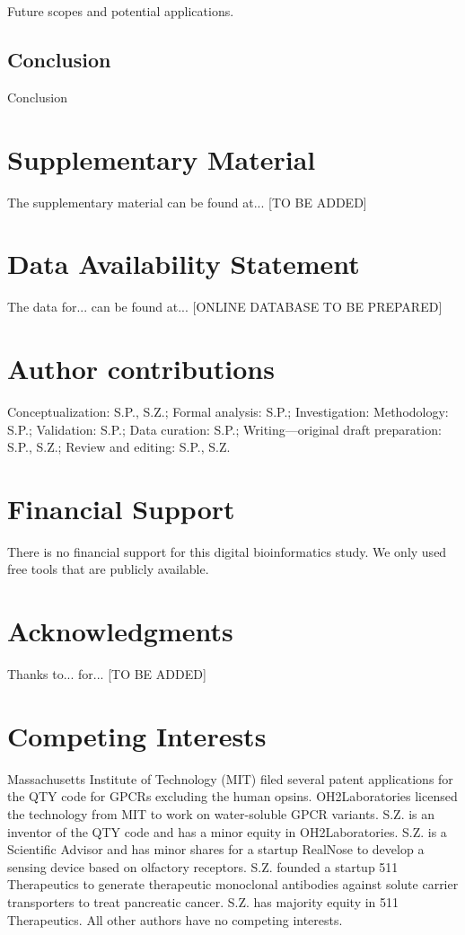 \documentclass[fleqn, 10pt, lineno]{manuscript}
\begin{document}
Future scopes and potential applications. 

\subsection*{Conclusion}

Conclusion


\section*{Supplementary Material}

The supplementary material can be found at... [TO BE ADDED]

\section*{Data Availability Statement} 

The data for... can be found at... [ONLINE DATABASE TO BE PREPARED]

\section*{Author contributions}

Conceptualization: S.P., S.Z.; Formal analysis: S.P.; Investigation: Methodology: S.P.; Validation: S.P.; Data curation: S.P.; Writing—original draft preparation: S.P., S.Z.; Review and editing: S.P., S.Z. 

\section*{Financial Support}

There is no financial support for this digital bioinformatics study. We only used free tools that are publicly available. 

\section*{Acknowledgments}

Thanks to... for... [TO BE ADDED]


\section*{Competing Interests}

Massachusetts Institute of Technology (MIT) filed several patent applications for the QTY code for GPCRs excluding the human opsins. OH2Laboratories licensed the technology from MIT to work on water-soluble GPCR variants. S.Z. is an inventor of the QTY code and has a minor equity in OH2Laboratories. S.Z. is a Scientific Advisor and has minor shares for a startup RealNose to develop a sensing device based on olfactory receptors. S.Z. founded a startup 511 Therapeutics to generate therapeutic monoclonal antibodies against solute carrier transporters to treat pancreatic cancer. S.Z. has majority equity in 511 Therapeutics. All other authors have no competing interests.
\end{document}
